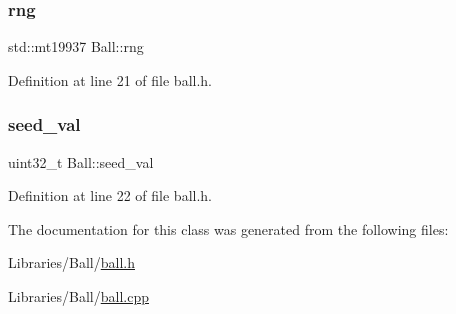 \subsubsection{\texorpdfstring{rng}{rng}}
{\footnotesize\ttfamily std\+::mt19937 Ball\+::rng\hspace{0.3cm}{\ttfamily [private]}}



Definition at line 21 of file ball.\+h.

\mbox{\label{class_ball_ad6e67b032167a7d9db9630bc5ab2e613}} 
\subsubsection{\texorpdfstring{seed\_val}{seed\_val}}
{\footnotesize\ttfamily uint32\+\_\+t Ball\+::seed\+\_\+val\hspace{0.3cm}{\ttfamily [private]}}



Definition at line 22 of file ball.\+h.



The documentation for this class was generated from the following files\+:\begin{DoxyCompactItemize}
\item 
Libraries/\+Ball/\mbox{\hyperlink{ball_8h}{ball.\+h}}\item 
Libraries/\+Ball/\mbox{\hyperlink{ball_8cpp}{ball.\+cpp}}\end{DoxyCompactItemize}
